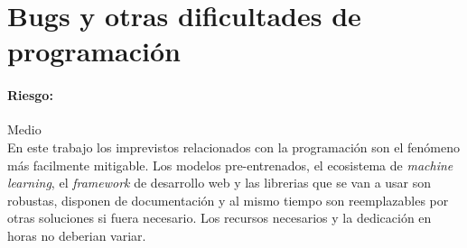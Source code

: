\section{Bugs y otras dificultades de programación}
\paragraph{Riesgo:} Medio\\
En este trabajo los imprevistos relacionados con la programación son el fenómeno
más facilmente mitigable. Los modelos pre-entrenados, el ecosistema de \textit{machine learning},
el \textit{framework} de desarrollo web y las librerias que se van a usar son robustas,
disponen de documentación y al mismo tiempo son reemplazables por otras soluciones si fuera necesario.
Los recursos necesarios y la dedicación en horas no deberian variar.